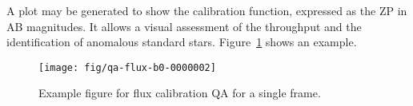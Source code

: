 \documentclass[12pt]{article}
\begin{document}
A plot may be generated to show the calibration function,
expressed as the ZP in AB magnitudes.
It allows a visual assessment of the throughput
and the identification of anomalous standard stars.
Figure~\ref{fig:fluxcalib_frame} shows an example.

\begin{figure}[htb]
\begin{center}
\texttt{[image: fig/qa-flux-b0-0000002]}
\caption{Example figure for flux calibration QA
for a single frame.  
}
\label{fig:fluxcalib_frame}
\end{center}
\end{figure}




\def\apjl{ApJL} %
\def\aj{AJ} %
\def\apj{ApJ} %
\def\pasp{PASP} %
\def\spie{SPIE} %
\def\apjs{ApJS} %
\def\araa{ARAA} %
\def\aap{A\&A} %
\def\aaps{A\&A~Supl.} %
\def\nat{Nature} %
\def\nar{New Astron. Rev.} %
\def\mnras{MNRAS} %
\def\jcap{JCAP} %
\def\prd{{Phys.~Rev.~D}}        %
\def\physrep{{Phys.~Reports}} %



\end{document}
